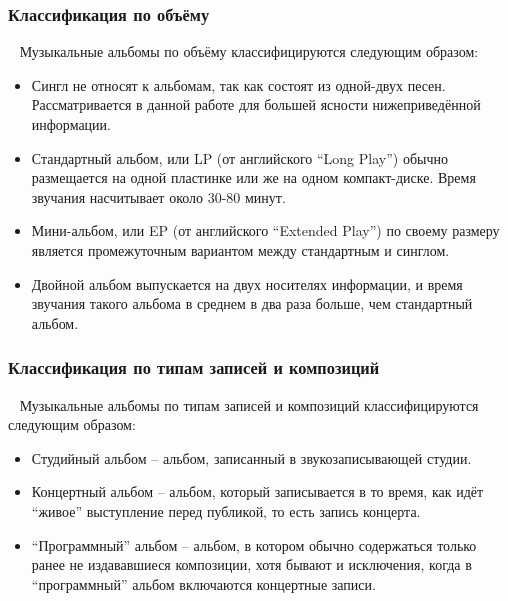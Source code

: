 \subsubsection{Классификация по объёму}
\label{sub:domain:music_album:volume_classification}
~\newline
\indent Музыкальные альбомы по объёму классифицируются следующим образом:
\begin{itemize}
  \item Сингл не относят к альбомам, так как состоят из одной-двух песен. Рассматривается в данной работе для большей ясности нижеприведённой информации.
  \item Стандартный альбом, или LP (от английского “Long Play”) обычно размещается на одной пластинке или же на одном компакт-диске. Время звучания насчитывает около 30-80 минут.
  \item Мини-альбом, или EP (от английского “Extended Play”) по своему размеру является промежуточным вариантом между стандартным и синглом.
  \item Двойной альбом выпускается на двух носителях информации, и время звучания такого альбома в среднем в два раза больше, чем стандартный альбом.
\end{itemize}

\subsubsection{Классификация по типам записей и композиций}
\label{sub:domain:music_album:records_type_classification}
~\newline
\indent Музыкальные альбомы по типам записей и композиций классифицируются следующим образом:
\begin{itemize}
  \item Студийный альбом -- альбом, записанный в звукозаписывающей студии.
  \item Концертный альбом -- альбом, который записывается в то время, как идёт “живое” выступление перед публикой, то есть запись концерта.
  \item “Программный” альбом -- альбом, в котором обычно содержаться только ранее не издававшиеся композиции, хотя бывают и исключения, когда в “программный” альбом включаются концертные записи.
\end{itemize}

